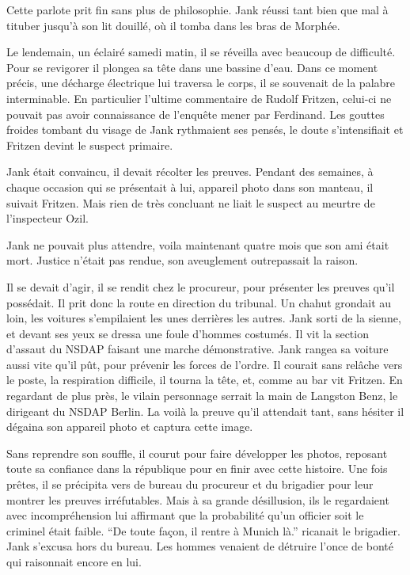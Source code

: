 Cette parlote prit fin sans plus de philosophie.
Jank réussi tant bien que mal à tituber jusqu'à son lit douillé, où il tomba dans les bras de Morphée.

Le lendemain, un éclairé samedi matin, il se réveilla avec beaucoup de difficulté.
Pour se revigorer il plongea sa tête dans une bassine d'eau. 
Dans ce moment précis, une décharge électrique lui traversa le corps, il se souvenait de la palabre interminable.
En particulier l'ultime commentaire de Rudolf Fritzen, celui-ci ne pouvait pas avoir connaissance de l'enquête mener par Ferdinand.
Les gouttes froides tombant du visage de Jank rythmaient ses pensés, le doute s'intensifiait et Fritzen devint le suspect primaire.

Jank était convaincu, il devait récolter les preuves. 
Pendant des semaines, à chaque occasion qui se présentait à lui, appareil photo dans son manteau, il suivait Fritzen.
Mais rien de très concluant ne liait le suspect au meurtre de l'inspecteur Ozil.

Jank ne pouvait plus attendre, voila maintenant quatre mois que son ami était mort.
Justice n'était pas rendue, son aveuglement outrepassait la raison.

Il se devait d'agir, il se rendit chez le procureur, pour présenter les preuves qu'il possédait.
Il prit donc la route en direction du tribunal.
Un chahut grondait au loin, les voitures s'empilaient les unes derrières les autres.
Jank sorti de la sienne, et devant ses yeux se dressa une foule d'hommes costumés.
Il vit la section d'assaut du NSDAP faisant une marche démonstrative.
Jank rangea sa voiture aussi vite qu'il pût, pour prévenir les forces de l'ordre.
Il courait sans relâche vers le poste, la respiration difficile, il tourna la tête, et, comme au bar vit Fritzen.
En regardant de plus près, le vilain personnage serrait la main de Langston Benz, le dirigeant du NSDAP Berlin.
La voilà la preuve qu'il attendait tant, sans hésiter il dégaina son appareil photo et captura cette image.

Sans reprendre son souffle, il courut pour faire développer les photos, reposant toute sa confiance dans la république pour en finir avec cette histoire.
Une fois prêtes, il se précipita vers de bureau du procureur et du brigadier pour leur montrer les preuves irréfutables.
Mais à sa grande désillusion, ils le regardaient avec incompréhension lui affirmant que la probabilité qu'un officier soit le criminel était faible.
\enquote{De toute façon, il rentre à Munich là.} ricanait le brigadier. 
Jank s'excusa hors du bureau. 
Les hommes venaient de détruire l'once de bonté qui raisonnait encore en lui.

